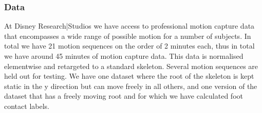 \subsubsection{Data}
At Disney Research|Studios we have access to professional motion capture data that encompasses a wide range of possible motion for a number of subjects. In total we have 21 motion sequences on the order of 2 minutes each, thus in total we have around 45 minutes of motion capture data. This data is normalised elementwise and retargeted to a standard skeleton. Several motion sequences are held out for testing.
We have one dataset where the root of the skeleton is kept static in the y direction but can move freely in all others, and one version of the dataset that has a freely moving root and for which we have calculated foot contact labels.